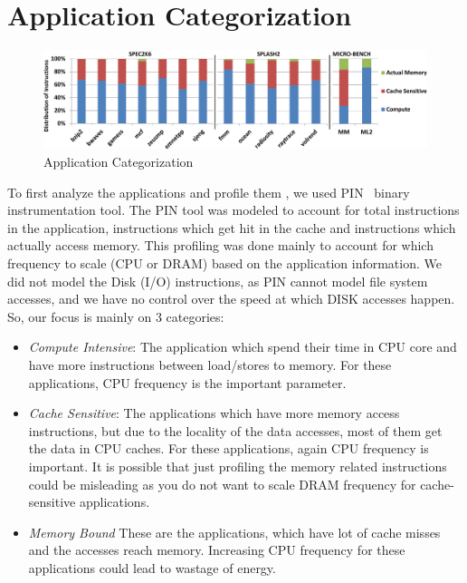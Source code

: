 \section{Application Categorization}\label{sec:appl}

\begin{figure}[ht]
  \begin{center}
\includegraphics[width=\linewidth]{figs/app-cat-crop.pdf}
  \end{center}
  \vspace{-0.1in}
  \caption{Application Categorization}
  \label{fig:def-perf}
\end{figure}

To first analyze the applications and profile them , we used PIN~\cite{pin} binary instrumentation tool. The PIN tool was modeled to account for total instructions in the application, instructions which get hit in the cache and instructions which actually access memory. 
This profiling was done mainly to account for
which frequency to scale (CPU or DRAM) based on the application information. 
We did not model the Disk (I/O) instructions, as PIN cannot model file system accesses, and
we have no control over the speed at which DISK accesses happen. So, our focus is
mainly on 3 categories:

\begin{itemize} 
\item \textit{Compute Intensive}: The application which spend their time in CPU core and have
more instructions between load/stores to memory. For these applications, CPU
frequency is the important parameter.
\item \textit{Cache Sensitive}: The applications which have more memory access instructions,
but due to the locality of the data accesses, most of them get the data in CPU caches.
For these applications, again CPU frequency is important. It is possible that just
profiling the memory related instructions could be misleading as you do not want to
scale DRAM frequency for cache-sensitive applications.
\item \textit{Memory Bound} These are the applications, which have lot of cache misses
and the accesses reach memory. Increasing CPU frequency for these applications could 
lead to wastage of energy. 
\end{itemize}

